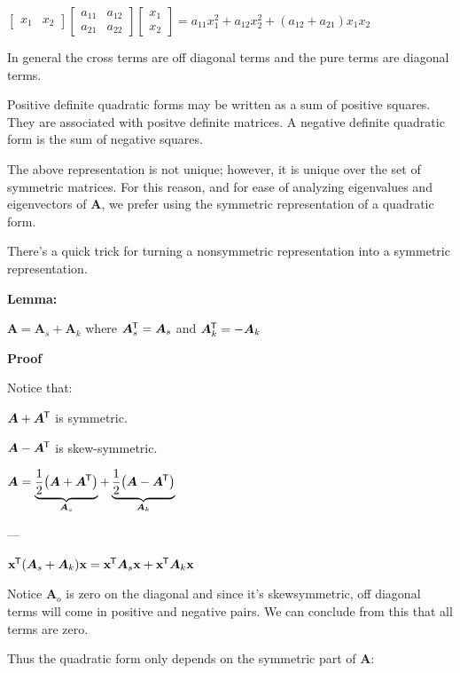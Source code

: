 \documentclass[11pt]{article}
\begin{document}
  \(\begin{bmatrix}
    x_1 & x_2
  \end{bmatrix}
  \begin{bmatrix}
    a_{11} & a_{12}  \\
    a_{21} & a_{22}
  \end{bmatrix}
  \begin{bmatrix}
    x_1 \\ x_2
  \end{bmatrix} = a_{11}x_1^2 + a_{12}x_2^2 + (a_{12} + a_{21})x_1x_2\)

  In general the cross terms are off diagonal terms and the pure terms are diagonal terms.

  \vspace{12pt}

  Positive definite quadratic forms may be written as a sum of positive squares. They are associated with positve
  definite matrices. A negative definite quadratic form is the sum of negative squares.

  The above representation is not unique; however, it is unique over the set of symmetric matrices.
  For this reason, and for ease of analyzing eigenvalues and eigenvectors of \(\bm{A}\), we prefer
  using the symmetric representation of a quadratic form.

  There's a quick trick for turning a nonsymmetric representation into a symmetric representation.

  \textbf{Lemma:}

  \(\bm{A} = \bm{A}_s + \bm{A}_k\) where \(\bm{A}_s^{\mkern-1.5mu\mathsf{T}} = \bm{A}_s\) and \(\bm{A}_k^{\mkern-1.5mu\mathsf{T}} = -\bm{A}_k\)

  \textbf{Proof}

  Notice that:

  \(\bm{A} + \bm{A}^{\mkern-1.5mu\mathsf{T}}\) is symmetric.

  \(\bm{A} - \bm{A}^{\mkern-1.5mu\mathsf{T}}\) is skew-symmetric.

  \(\bm{A} = \underbrace{\frac{1}{2}{\left( \bm{A} + \bm{A}^{\mkern-1.5mu\mathsf{T}} \right)}}_{\bm{A}_s} +
  \underbrace{\frac{1}{2}{\left( \bm{A} - \bm{A}^{\mkern-1.5mu\mathsf{T}} \right)}}_{\bm{A}_k}\)

  ---

  \(\mathbf{x}^{\mkern-1.5mu\mathsf{T}} (\bm{A}_s + \bm{A}_k) \mathbf{x} = \mathbf{x}^{\mkern-1.5mu\mathsf{T}} \bm{A}_s\mathbf{x} + \mathbf{x}^{\mkern-1.5mu\mathsf{T}}\bm{A}_k \mathbf{x}\)

  Notice \(\bm{A}_o\) is zero on the diagonal and since it's skewsymmetric, off diagonal terms
  will come in positive and negative pairs. We can conclude from this that all terms are zero.

  Thus the quadratic form only depends on the symmetric part of \(\bm{A}\):
\end{document}

